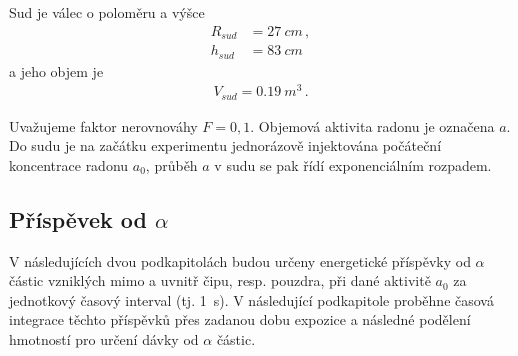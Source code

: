 \documentclass[11pt,a4paper]{article}
\begin{document}
Sud je válec o poloměru a výšce
\begin{align}
R_{sud}&=\SI{27}{cm}\,,\\
h_{sud}&=\SI{83}{cm}\,
\end{align}
a jeho objem je
\begin{align}
	V_{sud}=\SI{0,19}{m^3}\,.
\end{align}

Uvažujeme faktor nerovnováhy $F=0,1$. Objemová aktivita radonu je označena $a$. Do sudu je na začátku experimentu jednorázově injektována počáteční koncentrace radonu $a_0$, průběh $a$ v sudu se pak řídí exponenciálním rozpadem.
\subsection{Příspěvek od $\alpha$}
V následujících dvou podkapitolách budou určeny energetické příspěvky od $\alpha$ částic vzniklých mimo a uvnitř čipu, resp. pouzdra, při dané aktivitě $a_0$ za jednotkový časový interval (tj. \SI{1}{s}). V následující podkapitole proběhne časová integrace těchto příspěvků přes zadanou dobu expozice a následné podělení hmotností pro určení dávky od $\alpha$ částic.
\end{document}

